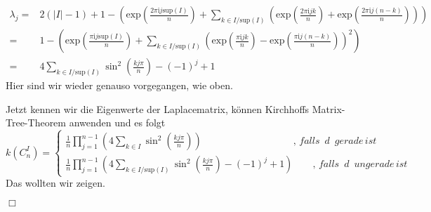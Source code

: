 \begin{equation}
\begin{aligned}
 \lambda_j = {} & { 2(|I|-1)+1 - \left(\mathrm{exp}{\left(\frac{2\pi \mathrm{i}j \mathrm{sup}(I)}{n}\right)}+ \sum_{k\in I/\mathrm{sup}(I)}\left(\mathrm{exp}{\left(\frac{2\pi \mathrm{i}jk}{n}\right)}+ \mathrm{exp}{\left(\frac{2\pi \mathrm{i}j(n-k)}{n}\right)}\right)\right)}\\
  = {} &1-\left(\mathrm{exp}{\left(\frac{\pi \mathrm{i}j \mathrm{sup}(I)}{n}\right)} +\sum_{k\in I/\mathrm{sup}(I)}\left(\mathrm{exp}{\left(\frac{\pi \mathrm{i}jk}{n}\right)} - \mathrm{exp}{\left(\frac{\pi \mathrm{i}j(n-k)}{n}\right)}\right)^2\right)\\
  = {} & 4\sum_{k\in I/\mathrm{sup}(I)} \sin^2 \left( \frac{kj\pi}{n}\right)-(-1)^j+1
 \end{aligned}
\end{equation}
\normalsize
Hier sind wir wieder genauso vorgegangen, wie oben.\\
\par
\endgroup
Jetzt kennen wir die Eigenwerte der Laplacematrix, können Kirchhoffs Matrix-Tree-Theorem anwenden und es folgt
\begin{equation}
\mathit{k}\left( C_n^I \right) = 
 \begin{cases}
\frac{1}{n} \prod_{j=1}^{n-1} \left(4 \sum_{k \in I} \sin^2 \left( \frac{kj\pi}{n}\right) \right)\qquad\qquad\qquad\qquad\quad\; ,\,falls\,\,\,d\,\,\,gerade\,ist\\
\frac{1}{n} \prod_{j=1}^{n-1} \left(4 \sum_{k \in I/\mathrm{sup}(I)} \sin^2 \left( \frac{kj\pi}{n}\right)-(-1)^j+1\right)\qquad,\,falls\,\,\,d\,\,\,ungerade\,ist
\end{cases}
\end{equation}
Das wollten wir zeigen.
\begin{flushright} $\Box$ \end{flushright} 
\begin{Bsps}
\end{Bsps} 

